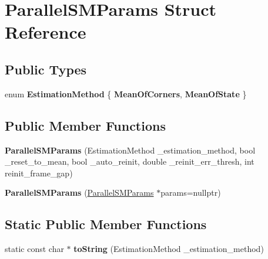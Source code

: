 \hypertarget{structParallelSMParams}{\section{Parallel\-S\-M\-Params Struct Reference}
\label{structParallelSMParams}
}
\subsection*{Public Types}
\begin{DoxyCompactItemize}
\item 
enum {\bfseries Estimation\-Method} \{ {\bfseries Mean\-Of\-Corners}, 
{\bfseries Mean\-Of\-State}
 \}
\end{DoxyCompactItemize}
\subsection*{Public Member Functions}
\begin{DoxyCompactItemize}
\item 
\hypertarget{structParallelSMParams_a66d7d93dcf484482cc17a2e0e1655672}{{\bfseries Parallel\-S\-M\-Params} (Estimation\-Method \-\_\-estimation\-\_\-method, bool \-\_\-reset\-\_\-to\-\_\-mean, bool \-\_\-auto\-\_\-reinit, double \-\_\-reinit\-\_\-err\-\_\-thresh, int reinit\-\_\-frame\-\_\-gap)}\label{structParallelSMParams_a66d7d93dcf484482cc17a2e0e1655672}

\item 
\hypertarget{structParallelSMParams_a7055dfba953c6a58549df4600a7ed73a}{{\bfseries Parallel\-S\-M\-Params} (\hyperlink{structParallelSMParams}{Parallel\-S\-M\-Params} $\ast$params=nullptr)}\label{structParallelSMParams_a7055dfba953c6a58549df4600a7ed73a}

\end{DoxyCompactItemize}
\subsection*{Static Public Member Functions}
\begin{DoxyCompactItemize}
\item 
\hypertarget{structParallelSMParams_affc464061ebc1c330a85ee237b3ad335}{static const char $\ast$ {\bfseries to\-String} (Estimation\-Method \-\_\-estimation\-\_\-method)}\label{structParallelSMParams_affc464061ebc1c330a85ee237b3ad335}

\end{DoxyCompactItemize}
